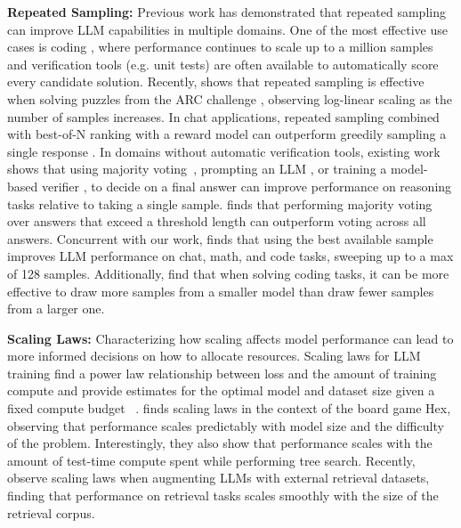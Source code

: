 \documentclass[11pt]{article}
\begin{document}
\noindent \textbf{Repeated Sampling:} Previous work has demonstrated that repeated sampling can improve LLM capabilities in multiple domains. One of the most effective use cases is coding \cite{rozière2023codellamaopenfoundation, chen2021evaluatinglargelanguagemodels, kulal2019spocsearchbasedpseudocodecode}, where performance continues to scale up to a million samples and verification tools (e.g. unit tests) are often available to automatically score every candidate solution. 
Recently, \citet{arc_gpt4o} shows that repeated sampling is effective when solving puzzles from the ARC challenge \cite{chollet2019measureintelligence}, observing log-linear scaling as the number of samples increases.
In chat applications, repeated sampling combined with best-of-N ranking with a reward model can outperform greedily sampling a single response \cite{irvine2023rewardingchatbotsrealworldengagement}.
In domains without automatic verification tools, existing work shows that using majority voting~\cite{wang2023selfconsistency}, prompting an LLM \cite{davis2024networksnetworkscomplexityclass}, or training a model-based verifier \cite{cobbe2021training, lightman2023lets, hosseini2024vstar, wang2024mathshepherdverifyreinforcellms, kang2024mindstarenhancingmathreasoning}, to decide on a final answer can improve performance on reasoning tasks relative to taking a single sample. \citet{nguyen2024consistentpredictionlikelycorrect} finds that performing majority voting over answers that exceed a threshold length can outperform voting across all answers. Concurrent with our work, \citet{song2024goodbadgreedyevaluation} finds that using the best available sample improves LLM performance on chat, math, and code tasks, sweeping up to a max of 128 samples. Additionally, \citet{hassid2024largerbetterimprovedllm} find that when solving coding tasks, it can be more effective to draw more samples from a smaller model than draw fewer samples from a larger one.


\;

\noindent \textbf{Scaling Laws:} Characterizing how scaling affects model performance can lead to more informed decisions on how to allocate resources. Scaling laws for LLM training find a power law relationship between loss and the amount of training compute and provide estimates for the optimal model and dataset size given a fixed compute budget ~\cite{hestness2017deeplearningscalingpredictable, kaplan2020scaling, hoffmann2022trainingcomputeoptimallargelanguage}.
\citet{jones2021scalingscalinglawsboard} finds scaling laws in the context of the board game Hex, observing that performance scales predictably with model size and the difficulty of the problem.
Interestingly, they also show that performance scales with the amount of test-time compute spent while performing tree search.
Recently, \citet{shao2024scalingretrievalbasedlanguagemodels} observe scaling laws when augmenting LLMs with external retrieval datasets, finding that performance on retrieval tasks scales smoothly with the size of the retrieval corpus.
\end{document}
